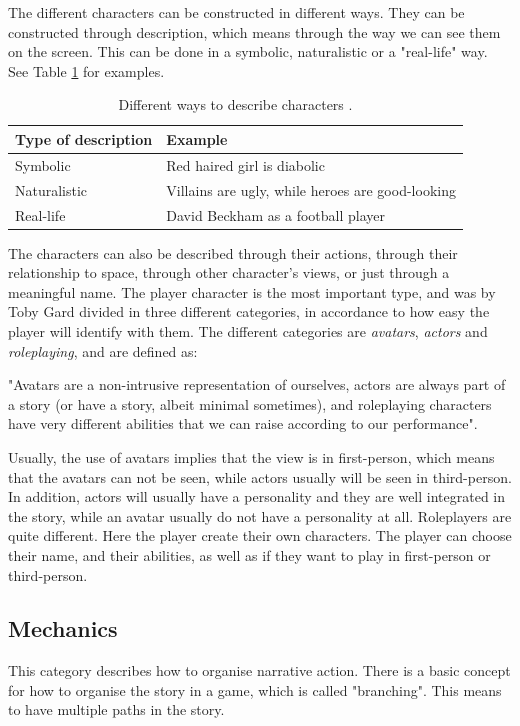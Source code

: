 The different characters can be constructed in different ways. They can be constructed through description, which means through the way we can see them on the screen. This can be done in a symbolic, naturalistic or a "real-life" way. See Table \ref{tab:description} for examples.

\begin{table}
\centering
    \begin{tabular}{|l|l|}
        \hline
        \textbf{Type of description} & \textbf{Example} \\ \hline
       Symbolic & Red haired girl is diabolic  \\ \hline
       Naturalistic & Villains are ugly, while heroes are good-looking \\ \hline
       Real-life & David Beckham as a football player \\ \hline
    \end{tabular}
    \caption[Different ways to describe characters]{Different ways to describe characters \cite{understandingvg}.}
    \label{tab:description}
\end{table} 

The characters can also be described through their actions, through their relationship to space, through other character’s views, or just through a meaningful name. The player character is the most important type, and was by Toby Gard divided in three different categories, in accordance to how easy the player will identify with them. The different categories are \emph{avatars}, \emph{actors} and \emph{roleplaying}, and are defined as:

"Avatars are a non-intrusive representation of ourselves, actors are always part of a story (or have a story, albeit minimal sometimes), and roleplaying characters have very different abilities that we can raise according to our performance". \cite{understandingvg}

Usually, the use of avatars implies that the view is in first-person, which means that the avatars can not be seen, while actors usually will be seen in third-person. In addition, actors will usually have a personality and they are well integrated in the story, while an avatar usually do not have a personality at all. Roleplayers are quite different. Here the player create their own characters. The player can choose their name, and their abilities, as well as if they want to play in first-person or third-person.  

\subsection{Mechanics}
This category describes how to organise narrative action. There is a basic concept for how to organise the story in a game, which is called "branching". This means to have multiple paths in the story. 

